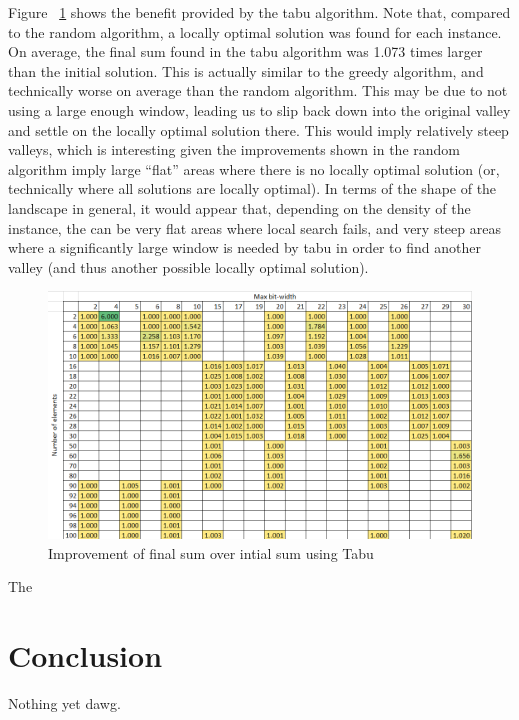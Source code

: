 \documentclass{report}
\begin{document}
Figure ~\ref{fig:tabu_final_initial_compare} shows the benefit provided by the tabu algorithm.
Note that, compared to the random algorithm, a locally optimal solution was found for each instance. On average,
the final sum found in the tabu algorithm was 1.073 times larger than the initial solution. This is actually similar
to the greedy algorithm, and technically worse on average than the random algorithm. This may be due to not using
a large enough window, leading us to slip back down into the original valley and settle on the locally optimal solution there.
This would imply relatively steep valleys, which is interesting given the improvements shown in the random algorithm
imply large ``flat'' areas where there is no locally optimal solution (or, technically where all solutions are locally optimal).
In terms of the shape of the landscape in general, it would appear that, depending on the density of the instance,
the can be very flat areas where local search fails, and very steep areas where a significantly large window is needed
by tabu in order to find another valley (and thus another possible locally optimal solution).

\begin{figure}[h]
  \centering
  \includegraphics[width=12cm]{p5_tabu_final_over_initial.png}
  \caption{Improvement of final sum over intial sum using Tabu}
  \label{fig:tabu_final_initial_compare}
\end{figure}

The 

\chapter{Conclusion}
Nothing yet dawg.



\end{document}
